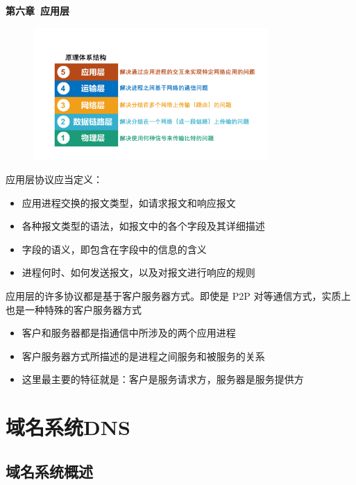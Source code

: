 \documentclass[cs4size,a4paper,10pt]{ctexart}
\begin{document}
	\begin{center}
		{\huge\textbf{第六章\ 应用层}}
	\end{center}
	\tableofcontents
	\clearpage

	\setcounter{page}{1}
	\setlength{\parskip}{0.65em}


	\begin{figure}[H]
		\centering
		\includegraphics[width=0.8\textwidth]{img/6.0}
	\end{figure}
	
	应用层协议应当定义：
	\begin{itemize}
		\item 应用进程交换的报文类型，如请求报文和响应报文
		\item 各种报文类型的语法，如报文中的各个字段及其详细描述
		\item 字段的语义，即包含在字段中的信息的含义
		\item 进程何时、如何发送报文，以及对报文进行响应的规则
	\end{itemize}

	应用层的许多协议都是基于客户服务器方式。即使是 P2P 对等通信方式，实质上也是一种特殊的客户服务器方式
	\begin{itemize}
		\item 客户和服务器都是指通信中所涉及的两个应用进程
		\item 客户服务器方式所描述的是进程之间服务和被服务的关系
		\item 这里最主要的特征就是：客户是服务请求方，服务器是服务提供方
	\end{itemize}

	\section{域名系统DNS}

	\subsection{域名系统概述}
\end{document}
